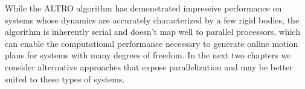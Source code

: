 \documentclass[../root.tex]{subfiles}
\begin{document}
    While the ALTRO algorithm has demonstrated impressive performance on systems whose 
    dynamics are accurately characterized by a few rigid bodies, the algorithm is inherently 
    serial and doesn't map well to parallel processors, which can enable the computational
    performance necessary to generate online motion plans for systems with many degrees of 
    freedom. In the next two chapters we consider alternative approaches that expose 
    parallelization and may be better suited to these types of systems.
\end{document}
